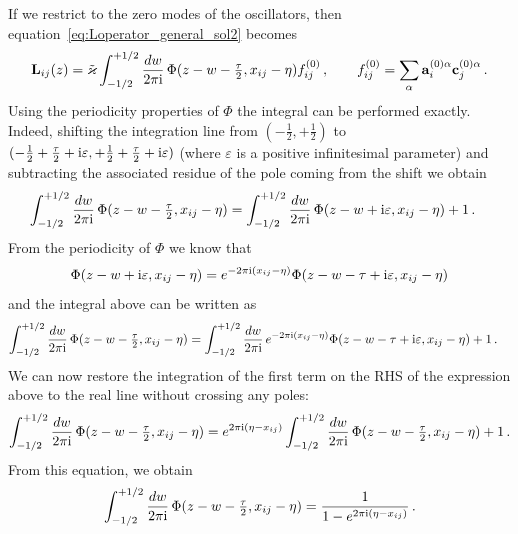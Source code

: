 If we restrict to the zero modes of the oscillators, then equation~\eqref{eq:Loperator_general_sol2} becomes
\begin{equation}
\mathbf{L}_{ij}(z) = \tilde{\varkappa} \int^{+1/2}_{-1/2} \frac{dw}{2 \pi \mathrm{i} } \,  \Phi(z-w-\tfrac{\tau}{2}, x_{ij}- \eta) f^{(0)}_{ij}\,, \qquad f^{(0)}_{ij} = \sum_{\alpha} \mathbf{a}_i^{(0)\alpha} \mathbf{c}_j^{(0)\alpha}  \,.
\end{equation}
Using the periodicity properties of $\Phi$ the integral can be performed exactly. Indeed, shifting the integration line from $(-\tfrac12, +\tfrac12)$ to $(-\tfrac12+\tfrac{\tau}{2}+ \mathrm{i} \varepsilon, +\tfrac12+\tfrac{\tau}{2}+ \mathrm{i} \varepsilon)$ (where $\varepsilon$ is a positive infinitesimal parameter) and subtracting the associated residue of the pole coming from the shift we obtain
\begin{equation}
\begin{split}
\int^{+1/2}_{-1/2} \frac{dw}{2 \pi \mathrm{i} } \,  \Phi(z-w-\tfrac{\tau}{2}, x_{ij}- \eta) &= \int^{+1/2}_{-1/2} \frac{dw}{2 \pi \mathrm{i} } \,  \Phi(z-w+\mathrm{i}\varepsilon, x_{ij}- \eta) +1 \,.
\end{split}
\end{equation}
From the periodicity of $\Phi$ we know that
\begin{equation}
\Phi(z-w+\mathrm{i}\varepsilon, x_{ij}- \eta)=e^{-2\pi\mathrm{i} (x_{ij}- \eta)} \Phi(z-w-\tau+\mathrm{i}\varepsilon, x_{ij}- \eta)
\end{equation}
and the integral above can be written as
\begin{equation}
\begin{split}
\int^{+1/2}_{-1/2} \frac{dw}{2 \pi \mathrm{i} } \,  \Phi(z-w-\tfrac{\tau}{2}, x_{ij}- \eta)&= \int^{+1/2}_{-1/2} \frac{dw}{2 \pi \mathrm{i} } \,  e^{-2\pi\mathrm{i} (x_{ij}- \eta)}\Phi(z-w-\tau+\mathrm{i}\varepsilon, x_{ij}- \eta) +1\,.
\end{split}
\end{equation}
We can now restore the integration of the first term on the RHS of the expression above to the real line without crossing any poles:
\begin{equation}
\int^{+1/2}_{-1/2} \frac{dw}{2 \pi \mathrm{i} } \,  \Phi(z-w-\tfrac{\tau}{2}, x_{ij}- \eta)= e^{2\pi\mathrm{i} (\eta-x_{ij})} \int^{+1/2}_{-1/2} \frac{dw}{2 \pi \mathrm{i} } \,  \Phi(z-w-\tfrac{\tau}{2}, x_{ij}- \eta) +1 \,.
\end{equation}
From this equation, we obtain
\begin{equation}
\begin{split}
\int^{+1/2}_{-1/2} \frac{dw}{2 \pi \mathrm{i} } \,  \Phi(z-w-\tfrac{\tau}{2}, x_{ij}- \eta) = \frac{1}{1-e^{2\pi\mathrm{i} (\eta-x_{ij})}} \,.
\end{split}
\end{equation}

